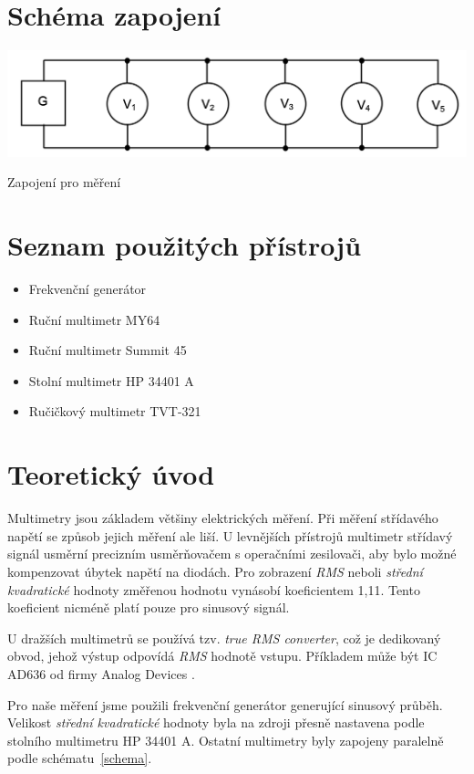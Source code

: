 \documentclass[a4paper,12pt]{article}   %
\begin{document}
\section{Schéma zapojení}
\begin{schema}[h!]
    \centering
    \includegraphics[width=.9\textwidth]{EMB-cv02-schema.png}
    \caption{Zapojení pro měření \cite{protokol}}
    \label{schema}
\end{schema}
\section{Seznam použitých přístrojů}
\begin{itemize}
    \item Frekvenční generátor
    \item Ruční multimetr MY64
    \item Ruční multimetr Summit 45
    \item Stolní multimetr HP 34401 A
    \item Ručičkový multimetr TVT-321
\end{itemize}

\section{Teoretický úvod}
Multimetry jsou základem většiny elektrických měření. Při měření střídavého napětí se způsob jejich měření ale liší. U levnějších přístrojů multimetr střídavý signál usměrní precizním usměrňovačem s operačními zesilovači, aby bylo možné kompenzovat úbytek napětí na diodách. Pro zobrazení \textit{RMS} neboli \textit{střední kvadratické} hodnoty změřenou hodnotu vynásobí koeficientem 1,11. Tento koeficient nicméně platí pouze pro sinusový signál.

U dražších multimetrů se používá tzv. \textit{true RMS converter}, což je dedikovaný obvod, jehož výstup odpovídá \textit{RMS} hodnotě vstupu. Příkladem může být IC AD636 od firmy Analog Devices \cite{datasheet_graf}.

Pro naše měření jsme použili frekvenční generátor generující sinusový průběh. Velikost \textit{střední kvadratické} hodnoty byla na zdroji přesně nastavena podle stolního multimetru HP 34401 A. Ostatní multimetry byly zapojeny paralelně podle schématu~\ref{schema}. 
\end{document}
